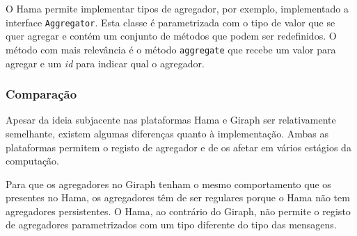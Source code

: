     O Hama permite implementar tipos de agregador, por exemplo, implementado 
a interface \texttt{Aggregator}.
    Esta classe é parametrizada com o tipo de valor que se quer agregar e 
contém um conjunto de métodos que podem ser redefinidos.
O método com mais relevância é o método \texttt{aggregate} que recebe um 
valor para agregar e um \textit{id} para indicar qual o agregador.

  \subsubsection*{Comparação}
  
  Apesar da ideia subjacente nas plataformas Hama e Giraph ser 
relativamente semelhante, existem algumas diferenças quanto à implementação. 
Ambas as plataformas
  permitem o registo de agregador e de os afetar em vários estágios da computação. 
  
  Para que os agregadores no Giraph tenham o mesmo comportamento que os presentes no Hama, os agregadores têm de ser regulares porque o Hama não tem agregadores persistentes. O Hama, ao contrário do Giraph, não permite o registo de agregadores parametrizados com um tipo diferente do tipo das mensagens.
  
